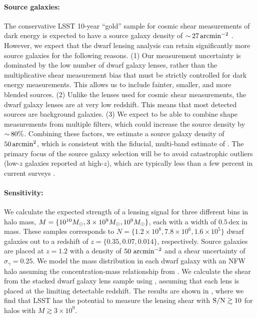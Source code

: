 \paragraph{Source galaxies:}
The conservative LSST 10-year ``gold'' sample for cosmic shear measurements of dark energy is expected to have a source galaxy density of $ {\sim}\, 27 \mathrm{\,arcmin}^{-2}$ \citep{Chang:2013,1809.01669}. 
However, we expect that the dwarf lensing analysis can retain significantly more source galaxies for the following reasons.
(1) Our measurement uncertainty is dominated by the low number of dwarf galaxy lenses, rather than the  multiplicative shear measurement bias that must be strictly controlled for dark energy measurements. This allows us to include fainter, smaller, and more blended sources.
(2) Unlike the lenses used for cosmic shear measurements, the dwarf galaxy lenses are at very low redshift. This means that most detected sources are background galaxies.
(3) We expect to be able to combine shape measurements from multiple filters, which could increase the source density by $ {\sim}\, 80\%$. 
Combining these factors, we estimate a source galaxy density of $50 \mathrm{\,arcmin}^2$, which is consistent with the fiducial, multi-band estimate of \citet{Chang:2013}.
The primary focus of the source galaxy selection will be to avoid catastrophic \photoz outliers (low-$z$ galaxies reported at high-$z$), which are typically less than a few percent in current surveys \citep{1406.4407}. 

\paragraph{Sensitivity:}
We calculate the expected strength of a lensing signal for three different bins in halo mass,  $M = \{10^{10} M_\odot, 3\times10^9 M_\odot, 10^{9} M_\odot \}$, each with a width of $0.5$\,dex in mass. 
These samples corresponds to $N = \{1.2\times10^8, 7.8\times10^6, 1.6\times10^5\}$ dwarf galaxies out to a redshift of $z = \{0.35, 0.07, 0.014\}$, respectively.
Source galaxies are placed at $z = 1.2$ with a density of $50 \hbox{ arcmin}^{-2}$ and a shear uncertainty of $\sigma_\gamma = 0.25$.
We model the mass distribution in each dwarf galaxy with an NFW halo assuming the concentration-mass relationship from \citet{1809.07326}.
We calculate the shear from the stacked dwarf galaxy lens sample using , assuming that each lens is  placed at the limiting detectable redshift.
The results are shown in , where we find that LSST has the potential to measure the lensing shear with ${\rm S/N} \gtrsim 10$ for halos with $M \gtrsim 3 \times 10^9$.


